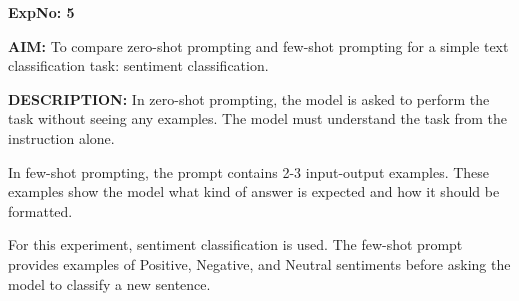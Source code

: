 \documentclass[10pt,a4paper]{article}
\begin{document}
\noindent\textbf{ExpNo: 5}

\noindent\textbf{AIM:} To compare zero-shot prompting and few-shot prompting for a simple text classification task: sentiment classification.

\noindent\textbf{DESCRIPTION:} In zero-shot prompting, the model is asked to perform the task without seeing any examples. The model must understand the task from the instruction alone.

In few-shot prompting, the prompt contains 2-3 input-output examples. These examples show the model what kind of answer is expected and how it should be formatted.

For this experiment, sentiment classification is used. The few-shot prompt provides examples of Positive, Negative, and Neutral sentiments before asking the model to classify a new sentence.
\end{document}
